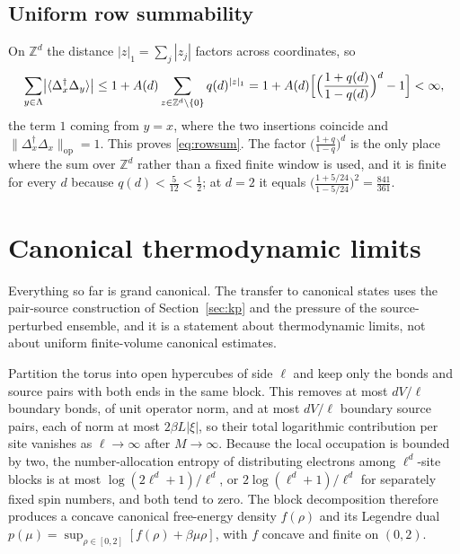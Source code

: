 \documentclass[11pt]{article}
\theoremstyle{plain}
\theoremstyle{definition}
\newcommand{\Dop}{\Delta}
\begin{document}
\subsection{Uniform row summability}

On $\mathbb Z^d$ the distance $|z|_1=\sum_j|z_j|$ factors across coordinates, so
\begin{equation}\label{eq:rowsumderivation}
 \sum_{y\in\Lambda}\bigl|\langle\Dop_x^\dagger\Dop_y\rangle\bigr|
 \le1+A(d)\sum_{z\in\mathbb Z^d\setminus\{0\}}q(d)^{|z|_1}
 =1+A(d)\Bigl[\Bigl(\frac{1+q(d)}{1-q(d)}\Bigr)^{d}-1\Bigr]<\infty,
\end{equation}
the term $1$ coming from $y=x$, where the two insertions coincide and
$\|\Dop_x^\dagger\Dop_x\|_{\mathrm{op}}=1$. This proves \eqref{eq:rowsum}. The factor
$\bigl(\frac{1+q}{1-q}\bigr)^d$ is the only place where the sum over $\mathbb Z^d$
rather than a fixed finite window is used, and it is finite for every $d$ because
$q(d)<\frac5{12}<\frac12$; at $d=2$ it equals
$\bigl(\frac{1+5/24}{1-5/24}\bigr)^2=\frac{841}{361}$.

\section{Canonical thermodynamic limits}\label{sec:canonical}

Everything so far is grand canonical. The transfer to canonical states uses the
pair-source construction of Section~\ref{sec:kp} and the pressure of the \mbox{source-perturbed} ensemble, and it is a statement about thermodynamic limits, not about
uniform finite-volume canonical estimates.

Partition the torus into open hypercubes of side $\ell$ and keep only the bonds and
source pairs with both ends in the same block. This removes at most $dV/\ell$
boundary bonds, of unit operator norm, and at most $dV/\ell$ boundary source pairs,
each of norm at most $2\beta L|\xi|$, so their total logarithmic contribution per
site vanishes as $\ell\to\infty$ after $M\to\infty$. Because the local occupation is
bounded by two, the number-allocation entropy of distributing electrons among
$\ell^d$-site blocks is at most $\log(2\ell^d+1)/\ell^d$, or
$2\log(\ell^d+1)/\ell^d$ for separately fixed spin numbers, and both tend to zero.
The block decomposition therefore produces a concave canonical free-energy density
$f(\rho)$ and its Legendre dual $p(\mu)=\sup_{\rho\in[0,2]}[f(\rho)+\beta\mu\rho]$,
with $f$ concave and finite on $(0,2)$.
\end{document}
